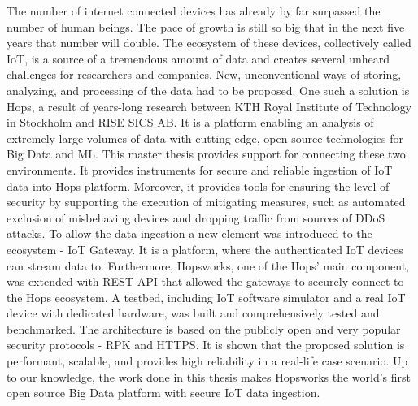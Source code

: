     The number of internet connected devices has already by far surpassed the number of human beings.
    The pace of growth is still so big that in the next five years that number will double.
    The ecosystem of these devices, collectively called \ac{IoT}, is a source of a tremendous amount of data and creates several unheard challenges for researchers and companies.
    New, unconventional ways of storing, analyzing, and processing of the data had to be proposed. 
    One such a solution is \ac{Hops}, a result of years-long research between KTH Royal Institute of Technology in Stockholm and RISE SICS AB.
     It is a platform enabling an analysis of extremely large volumes of data with cutting-edge, open-source technologies for Big Data and \ac{ML}.
     This master thesis provides support for connecting these two environments.
     It provides instruments for secure and reliable ingestion of \ac{IoT} data into Hops platform. 
     Moreover, it provides tools for ensuring the level of security by supporting the execution of mitigating measures, such as automated exclusion of misbehaving devices and dropping traffic from sources of \ac{DDoS} attacks. 
     To allow the data ingestion a new element was introduced to the ecosystem - IoT Gateway. 
     It is a platform, where the authenticated \ac{IoT} devices can stream data to. 
     Furthermore, Hopsworks, one of the Hops' main component, was extended with REST API that allowed the gateways to securely connect to the Hops ecosystem. 
     A testbed, including \ac{IoT} software simulator and a real \ac{IoT} device with dedicated hardware, was built and comprehensively tested and benchmarked.
     The architecture is based on the publicly open and very popular security protocols - \ac{RPK} and \ac{HTTPS}.
     It is shown that the proposed solution is performant, scalable, and provides high reliability in a real-life case scenario.
     Up to our knowledge, the work done in this thesis makes Hopsworks the world's first open source Big Data platform with secure \ac{IoT} data ingestion. 